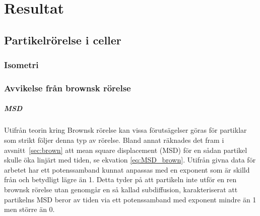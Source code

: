 \chapter{Resultat}

\section{Partikelrörelse i celler}

\subsection{Isometri}



\subsection{Avvikelse från brownsk rörelse}

\paragraph{MSD}
Utifrån teorin kring Brownsk rörelse kan vissa förutsägelser göras för partiklar som strikt följer denna typ av rörelse. Bland annat räknades det fram i avsnitt~\ref{sec:brown} att mean square displacement (MSD) för en sådan partikel skulle öka linjärt med tiden, se ekvation \todo{}\eqref{eq:MSD_brown}. Utifrån givna data för arbetet har ett potenssamband kunnat anpassas med en exponent som är skilld från och betydligt lägre än 1. Detta tyder på att partikeln inte utför en ren brownsk rörelse utan genomgår en så kallad subdiffusion, karakteriserat att partikelns MSD beror av tiden via ett potenssamband med exponent mindre än 1 men större än 0.

